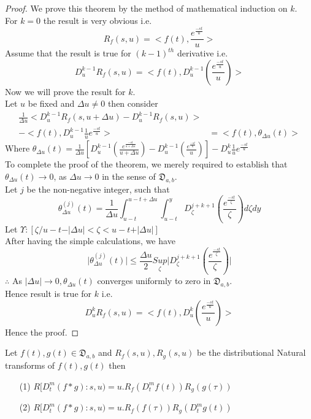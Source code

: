 \begin{proof}
We prove this theorem by the method of mathematical induction on $k$.\\
For $k=0$ the result is very obvious i.e.
\begin{equation*}
R_{f}(s,u)=<f(t),\frac{e^{\frac{-st}{u}}}{u}>
\end{equation*}
Assume that the result is true for $(k-1)^{th}$ derivative i.e.
\begin{equation*}
D_{u}^{k-1}R_{f}(s,u)=<f(t),D_{u}^{k-1}(\frac{e^{\frac{-st}{u}}}{u})>
\end{equation*}
Now we will prove the result for $k$.\\
Let $ u $ be fixed and $\Delta{u}\neq 0$ then consider 
\begin{align*}
\frac{1}{\Delta{u}}<D_{u}^{k-1}R_{f}(s,u+\Delta{u})-D_{u}^{k-1}R_{f}(s,u)>\\
-<f(t),D_{u}^{k-1}\frac{1}{u}e^{\frac{-st}{u}}>
&=<f(t),\theta_{\Delta{u}}(t)>
\end{align*}
Where $\theta_{\Delta{u}}(t)=\frac{1}{\Delta{u}}[D_{u}^{k-1}(\frac{e^{\frac{-st}{u+\Delta{u}}}}{u+\Delta{u}})-D_{u}^{k-1}(\frac{e^{\frac{-st}{u}}}{u})]-D_{u}^{k}\frac{1}{u}e^{\frac{-st}{u}}$\\
To complete the proof of the theorem, we merely required to establish that $\theta_{\Delta{u}}(t)\rightarrow 0$, as ${\Delta{u}}\rightarrow 0 $ in the sense of $\mathfrak{D}_{a,b}$.\\
Let $ j $ be the non-negative integer, such that
\begin{equation}
\theta_{\Delta{u}}^{(j)}(t)= \frac{1}{\Delta{u}}\int_{u-t}^{u-t+\Delta{u}}\int_{u-t}^{y}D_{\zeta}^{j+k+1}(\frac{e^{\frac{-st}{\zeta}}}{\zeta})d\zeta dy
\end{equation}
Let $\Upsilon : [\zeta / u-t-\vert\Delta{u}\vert < \zeta < u-t+\vert\Delta{u}\vert]$\\
After having the simple calculations, we have
\begin{equation*}
\vert\theta_{\Delta{u}}^{(j)}(t)\vert\leq\frac{\Delta{u}}{2}\underset{\zeta}{Sup}\vert D_{\zeta}^{j+k+1}(\frac{e^{\frac{-st}{\zeta}}}{\zeta})\vert
\end{equation*}
$\therefore$ As $\vert\Delta{u}\vert \rightarrow 0 ,\theta_{\Delta{u}}(t)$ converges uniformly to zero in $\mathfrak{D}_{a,b}$.\\
Hence result is true for $k$ i.e.
\begin{equation}
D_{u}^{k}R_{f}(s,u)=<f(t),D_{u}^{k}(\frac{e^{\frac{-st}{u}}}{u})>
\end{equation}
Hence the proof.
\end{proof}
\begin{theorem}
 Let $f(t),g(t)\in \mathfrak{D}_{a,b}$ and $R_{f}(s,u),R_{g}(s,u)$ be the distributional Natural transforms of $f(t),g(t)$ then
\begin{itemize}
\item[(1)]$R[D^{m}_{t}(f \ast g):s,u)=u.R_{f}(D^{m}_{t}f(t))R_{g}(g(\tau))$
\item[(2)]$R[D^{m}_{t}(f \ast g):s,u)=u.R_{f}(f(\tau))R_{g}(D^{m}_{t}g(t))$
\end{itemize}
\end{theorem}

